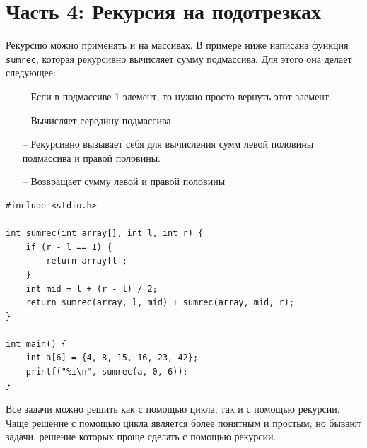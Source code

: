 \documentclass{article}
\begin{document}
\section*{Часть 4: Рекурсия на подотрезках}
Рекурсию можно применять и на массивах. В примере ниже написана функция \texttt{sumrec}, которая рекурсивно вычисляет сумму подмассива. Для этого она делает следующее:
\begin{itemize}
\item[--] Если в подмассиве 1 элемент, то нужно просто вернуть этот элемент.
\item[--] Вычисляет середину подмассива
\item[--] Рекурсивно вызывает себя для вычисления сумм левой половины подмассива и правой половины.
\item[--] Возвращает сумму левой и правой половины 
\end{itemize}
\begin{lstlisting}
#include <stdio.h>

int sumrec(int array[], int l, int r) {
    if (r - l == 1) {
        return array[l];
    }
    int mid = l + (r - l) / 2;
    return sumrec(array, l, mid) + sumrec(array, mid, r); 
}

int main() {
    int a[6] = {4, 8, 15, 16, 23, 42};
    printf("%i\n", sumrec(a, 0, 6));
}
\end{lstlisting}
Все задачи можно решить как с помощью цикла, так и с помощью рекурсии. Чаще решение с помощью цикла является более понятным и простым, но бывают задачи, решение которых проще сделать с помощью рекурсии.
\end{document}
